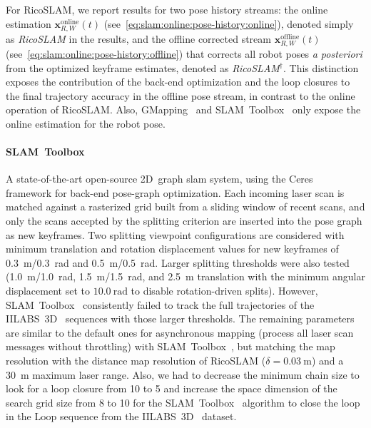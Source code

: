For RicoSLAM, we report results for two pose history streams:
the online estimation
$\mathbf{x}_{R,W}^{\mathrm{online}}(t)$
(see~\eqref{eq:slam:online:pose-history:online}), denoted simply as
\emph{RicoSLAM} in the results, and the offline corrected stream
$\mathbf{x}_{R,W}^{\mathrm{offline}}(t)$
(see~\eqref{eq:slam:online:pose-history:offline}) that corrects all robot
poses \emph{a posteriori} from the optimized keyframe estimates, denoted as
\emph{RicoSLAM$^{\dagger}$}. This distinction exposes the contribution of
the back-end optimization and the loop closures to the final trajectory accuracy
in the offline pose stream, in contrast to the online operation of RicoSLAM.
Also, GMapping~\cite{grisetti:tro:2007} and
SLAM~Toolbox~\cite{macenski-jambrecic:joss:2021} only expose
the online estimation for the robot pose.

\paragraph{SLAM~Toolbox~\cite{macenski-jambrecic:joss:2021}}
A state-of-the-art open-source 2D~graph \gls{slam} system, using the
Ceres~\cite{ceres:sw:2023} framework for back-end pose-graph optimization.
Each incoming laser scan is matched against a rasterized grid built from
a sliding window of recent scans, and only the scans accepted by
the splitting criterion are inserted into the pose graph as new keyframes.
Two splitting viewpoint configurations are considered with minimum
translation and rotation displacement values for new keyframes of
\SI{0.3}{\metre}/\SI{0.3}{\radian} and
\SI{0.5}{\metre}/\SI{0.5}{\radian}.
Larger splitting thresholds were also tested
(\SI{1.0}{\metre}/\SI{1.0}{\radian},
\SI{1.5}{\metre}/\SI{1.5}{\radian}, and \SI{2.5}{\metre} translation
with the minimum angular displacement set to $\SI{10.0}{\radian}$ to
disable rotation-driven splits). However,
SLAM~Toolbox~\cite{macenski-jambrecic:joss:2021} consistently failed to track
the full trajectories of the IILABS~3D~\cite{ribeiro:access:2025} sequences
with those larger thresholds.
The remaining parameters are similar to the default ones for asynchronous
mapping (process all laser scan messages without throttling) with
SLAM~Toolbox~\cite{macenski-jambrecic:joss:2021}, but matching the map
resolution with the distance map resolution of RicoSLAM
($\delta = \SI{0.03}{\metre}$) and a \SI{30}{\metre} maximum laser range.
Also, we had to decrease the minimum chain size to look for a loop closure from
10 to 5 and increase the space dimension of the search grid size from 8 to 10
for the SLAM~Toolbox~\cite{macenski-jambrecic:joss:2021} algorithm to close the
loop in the Loop sequence from the IILABS~3D~\cite{ribeiro:access:2025} dataset.


